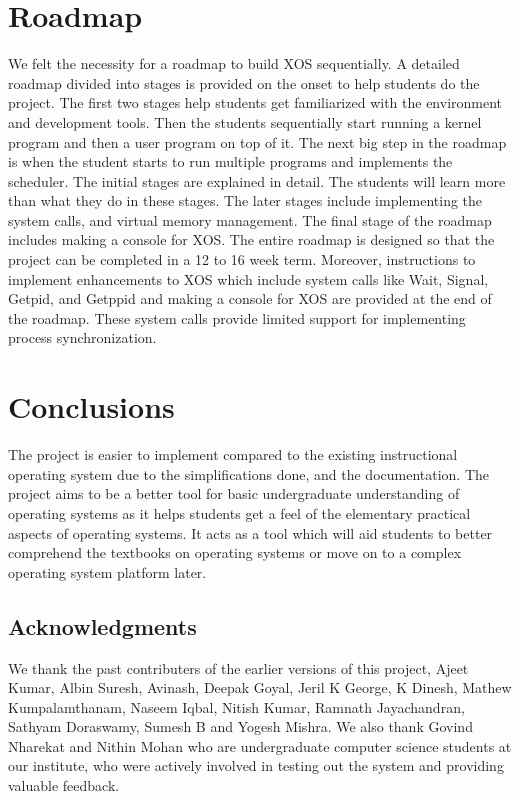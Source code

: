 \documentclass[10pt]{report}
\begin{document}
\chapter{Roadmap}
\label{sec:roadmap}
We felt the necessity for a roadmap to build XOS sequentially. A detailed roadmap divided into stages is provided on the onset to help students do the project. The first two stages help students get familiarized with the environment and development tools. Then the students sequentially start running a kernel program and then a user program on top of it. The next big step in the roadmap is when the student starts to run multiple programs and implements the scheduler. The initial stages are explained in detail. The students will learn more than what they do in these stages. The later stages include implementing the system calls, and virtual memory management. The final stage of the roadmap includes making a console for XOS. The entire roadmap is designed so that the project can be completed in a 12 to 16 week term. Moreover, instructions to implement enhancements to XOS which include system calls like Wait, Signal, Getpid, and Getppid and making a console for XOS are provided at the end of the roadmap. These system calls provide limited support for implementing process synchronization. \\

\chapter{Conclusions}
The project is easier to implement compared to the existing instructional operating system due to the simplifications done, and the documentation. The project aims to be a better tool for basic undergraduate understanding of operating systems as it helps students get a feel of the elementary practical aspects of operating systems. It acts as a tool which will aid students to better comprehend the textbooks on operating systems or move on to a complex operating system platform later.


\section{Acknowledgments}
We thank the past contributers of the earlier versions of this project, Ajeet Kumar, Albin Suresh, Avinash, Deepak Goyal, Jeril K George, K Dinesh, Mathew Kumpalamthanam, Naseem Iqbal, Nitish Kumar, Ramnath Jayachandran, Sathyam Doraswamy, Sumesh B and Yogesh Mishra. We also thank Govind Nharekat and Nithin Mohan who are undergraduate computer science students at our institute, who were actively involved in testing out the system and providing valuable feedback. 
\end{document}
